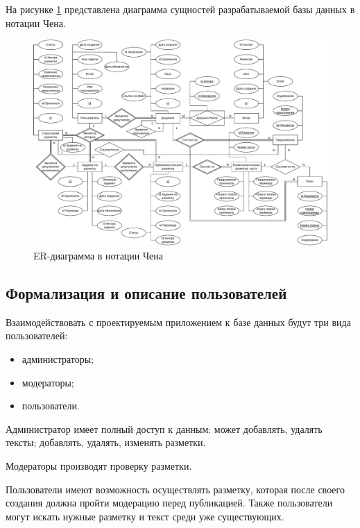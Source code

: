 

На рисунке \ref{fig:chen} представлена диаграмма сущностей разрабатываемой базы данных в нотации Чена.

\begin{figure}[H]
	\centering
	\includegraphics[angle=90, width=\textwidth]{diag/chen-v8.pdf}
	\caption{ER-диаграмма в нотации Чена}
	\label{fig:chen}
\end{figure}

\subsection{Формализация и описание пользователей}

Взаимодействовать с проектируемым приложением к базе данных будут три вида пользователей:
\begin{itemize}
    \item администраторы;
    \item модераторы;
    \item пользователи.
\end{itemize}

Администратор имеет полный доступ к данным: может добавлять, удалять тексты; добавлять, удалять, изменять разметки.

Модераторы производят проверку разметки.

Пользователи имеют возможность осуществлять разметку, которая после своего создания должна пройти модерацию перед публикацией.
Также пользователи могут искать нужные разметку и текст среди уже существующих.

